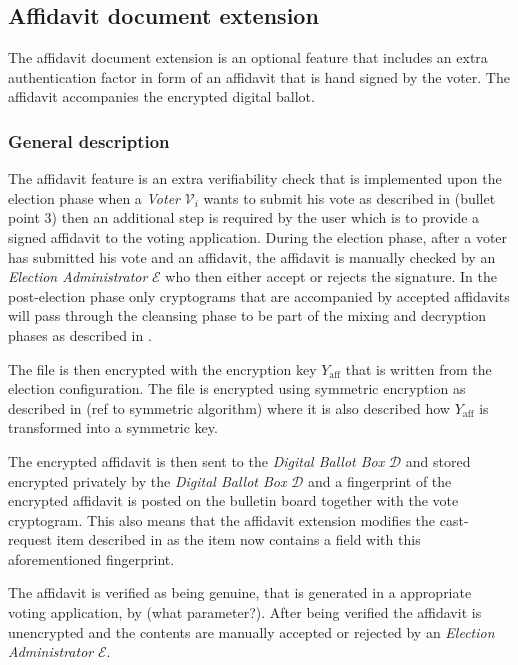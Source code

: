\subsection{Affidavit document extension} \label{app: affidavit document extension}
The affidavit document extension is an optional feature that includes an extra authentication factor in form of an affidavit that is hand signed by the voter. The affidavit accompanies the encrypted digital ballot.


\subsubsection{General description}
The affidavit feature is an extra verifiability check that is implemented upon the election phase when a \textit{Voter} $\mathcal{V}_i$ wants to submit his vote as described in  (bullet point 3) then an additional step is required by the user which is to provide a signed affidavit to the voting application. During the election phase, after a voter has submitted his vote and an affidavit, the affidavit is manually checked by an \textit{Election Administrator} $\mathcal{E}$ who then either accept or rejects the signature. In the post-election phase only cryptograms that are accompanied by accepted affidavits will pass through the cleansing phase to be part of the mixing and decryption phases as described in .

The file is then encrypted with the encryption key $Y_\mathrm{aff}$ that is written from the election configuration. The file is encrypted using symmetric encryption as described in (ref to symmetric algorithm) where it is also described how $Y_\mathrm{aff}$ is transformed into a symmetric key.

The encrypted affidavit is then sent to the \textit{Digital Ballot Box} $\mathcal{D}$ and stored encrypted privately by the \textit{Digital Ballot Box} $\mathcal{D}$ and a fingerprint of the encrypted affidavit is posted on the bulletin board together with the vote cryptogram. This also means that the affidavit extension modifies the cast-request item described in  as the item now contains a field with this aforementioned fingerprint.


The affidavit is verified as being genuine, that is generated in a appropriate voting application, by (what parameter?). After being verified the affidavit is unencrypted and the contents are manually accepted or rejected by an \textit{Election Administrator} $\mathcal{E}$.

